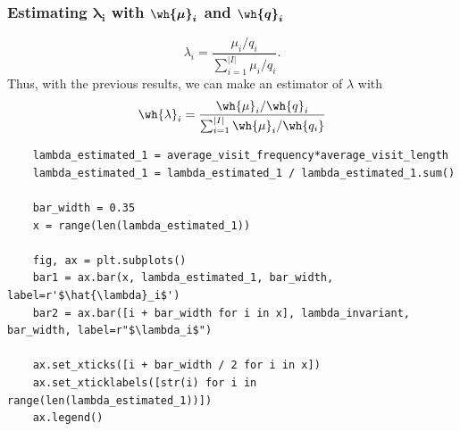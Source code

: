 \subsubsection*{Estimating $\boldsymbol{\lambda_i}$ with $\boldsymbol{\wh{\mu}_i}$ and $\boldsymbol{\wh{q}_i}$}

\[\lambda_i = \frac{\mu_i/q_i}{\sum_{i = 1}^{|I|} \mu_i/q_i}. \]
Thus, with the previous results, we can make an estimator of $\lambda$ with
\[ \wh{\lambda}_i = \frac{\wh{\mu}_i/\wh{q}_i}{\sum_{i = 1}^{|I|} \wh{\mu}_i/\wh{q_i}} \]

\begin{verbatim}
    lambda_estimated_1 = average_visit_frequency*average_visit_length
    lambda_estimated_1 = lambda_estimated_1 / lambda_estimated_1.sum()

    bar_width = 0.35
    x = range(len(lambda_estimated_1))

    fig, ax = plt.subplots()
    bar1 = ax.bar(x, lambda_estimated_1, bar_width, label=r'$\hat{\lambda}_i$')
    bar2 = ax.bar([i + bar_width for i in x], lambda_invariant, bar_width, label=r"$\lambda_i$")

    ax.set_xticks([i + bar_width / 2 for i in x])
    ax.set_xticklabels([str(i) for i in range(len(lambda_estimated_1))])
    ax.legend()
\end{verbatim}

